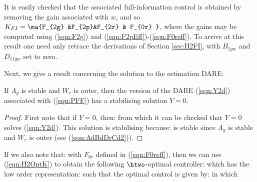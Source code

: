 It is easily checked that the associated full-information control is obtained by removing the gain associated with $w$, and so  $K_{FI}=\ma{F_{2g} &F_{2p}&F_{2r} & F_{0r} }$, where the gains may be computed using (\ref{eqn:F2g}) and (\ref{eqn:F2pEff})-(\ref{eqn:F0reff}). To arrive at this result one need only retrace the derivations of Section \ref{sec:H2FI}, with $B_{1gw}$ and $D_{11gw}$ set to zero.

Next, we give a result concerning the solution to the estimation DARE:
\begin{lem}
If $A_g$ is stable and $W_r$ is outer, then the version of the DARE (\ref{eqn:Y2d}) associated with (\ref{eqn:PFF}) has a stabilising solution $Y=0$.
\end{lem}
\begin{proof}
First note that if $Y=0$, then:
from which it can be checked that $Y=0$ solves (\ref{eqn:Y2d}). This solution is stabilising because:
is stable since $A_g$ is stable and $W_r$ is outer (see (\ref{eqn:AdBdDrCd2})).
\end{proof}
If we also note that:
with $F_{0r}$ defined in (\ref{eqn:F0reff}),
then we can use (\ref{eqn:H2OptK}) to obtain the following $\htwo$-optimal controller:
%
which has the low order representation:
%
such that the optimal control is given by:
in which
